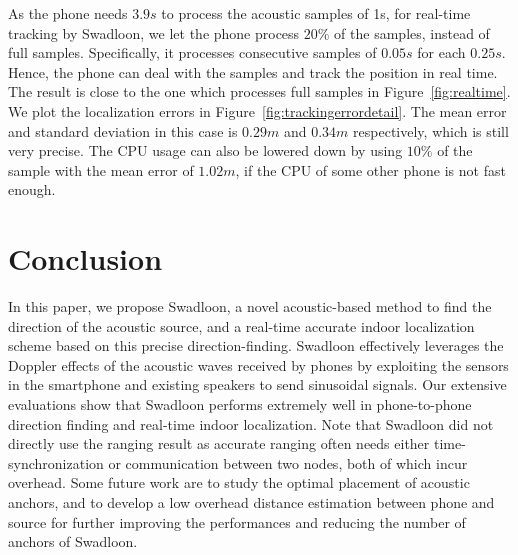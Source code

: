 \documentclass[]{sig-alternate-10pt}
\def \ourprotocol{Swadloon\xspace}
\begin{document}
As the phone needs $3.9s$ to process the acoustic samples of 1s, for
 real-time tracking by \ourprotocol,
 we let the phone process $20\%$ of the samples, instead
 of  full samples.
Specifically, it processes consecutive samples of
 $0.05s$ for each $0.25s$.
Hence, the phone can deal with the samples and
 track the position in real time.
The result is  close to the one which processes full  samples in Figure~\ref{fig:realtime}.
We  plot the localization errors in
Figure~\ref{fig:trackingerrordetail}.
The mean error and standard deviation in  this case is $0.29m$ and $0.34m$
respectively, which is still very precise. The CPU usage can also be
lowered down by using $10\%$ of the sample with the mean error of
$1.02m$, if the CPU of some other phone is not fast enough.


\section{Conclusion}
\label{sec:conclusion}

In this paper, we propose \ourprotocol, a novel acoustic-based method
 to find the direction of the acoustic source, and a real-time accurate
 indoor localization scheme based on this precise direction-finding.  
\ourprotocol effectively    leverages the Doppler effects of
 the acoustic waves received by phones by exploiting the 
 sensors in the smartphone and existing speakers to send sinusoidal
 signals. 
Our extensive evaluations show that \ourprotocol performs extremely
 well in phone-to-phone direction finding and real-time indoor
 localization.  Note that \ourprotocol did not directly use the ranging result as accurate ranging often needs either time-synchronization or communication between two nodes, both of which incur overhead. Some future work are to study the optimal placement of acoustic anchors,
 and to develop a low overhead distance estimation between phone and source for
 further improving the performances and reducing the number of anchors of \ourprotocol.





{\small



}
\end{document}
